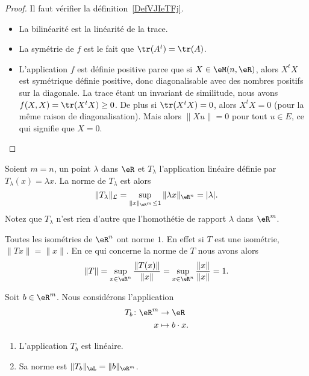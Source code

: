 \begin{proof}
	Il faut vérifier la définition~\ref{DefVJIeTFj}.
	\begin{itemize}
		\item La bilinéarité est la linéarité de la trace.
		\item La symétrie de \( f\) est le fait que \( \tr(A^t)=\tr(A)\).
		\item L'application \( f\) est définie positive parce que si \( X\in \eM(n,\eR)\), alors \( X^tX\) est symétrique définie positive, donc diagonalisable avec des nombres positifs sur la diagonale. La trace étant un invariant de similitude, nous avons \( f(X,X)=\tr(X^tX)\geq 0\). De plus si \( \tr(X^tX)=0\), alors \( X^tX=0\) (pour la même raison de diagonalisation). Mais alors \( \| Xu \|=0\) pour tout \( u\in E\), ce qui signifie que \( X=0\).
	\end{itemize}
\end{proof}

\begin{example}     \label{EXooHDCWooHragNA}
	Soient \( m=n\), un point \( \lambda\) dans \( \eR\) et \( T_{\lambda}\) l'application linéaire définie par \( T_{\lambda}(x)=\lambda x\). La norme de \( T_{\lambda}\) est alors
	\[
		\|T_{\lambda}\|_{\mathcal{L}}=\sup_{\|x\|_{\eR^m}\leq 1}\|\lambda x\|_{\eR^n}= |\lambda|.
	\]
	Notez que \( T_{\lambda}\) n'est rien d'autre que l'homothétie de rapport \( \lambda\) dans \( \eR^m\).
\end{example}

\begin{example}     \label{EXooVXENooZbtBNi}
	Toutes les isométries de \( \eR^n\) ont norme \( 1\). En effet si \( T\) est une isométrie, \( \| Tx \|=\| x \|\). En ce qui concerne la norme de \( T\) nous avons alors
	\begin{equation}
		\| T \|=\sup_{x\in\eR^n}\frac{ \| T(x) \| }{ \| x \| }=\sup_{x\in\eR^n}\frac{ \| x \| }{ \| x \| }=1.
	\end{equation}
\end{example}


\begin{lemma}       \label{LEMooNWQWooBrpXgn}
	Soit \( b\in \eR^m\). Nous considérons l'application
	\begin{equation}
		\begin{aligned}
			T_b\colon \eR^m & \to \eR           \\
			x               & \mapsto b\cdot x.
		\end{aligned}
	\end{equation}
	\begin{enumerate}
		\item
		      L'application \( T_b\) est linéaire.
		\item
		      Sa norme est \( \| T_b \|_{\aL}=\| b \|_{\eR^m}\).
	\end{enumerate}
\end{lemma}


